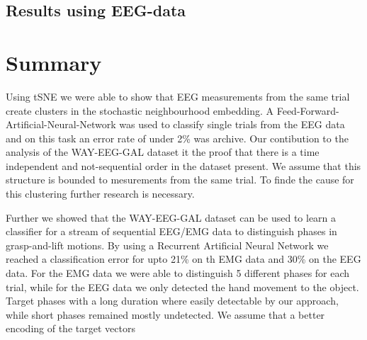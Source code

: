 \documentclass{article} %
\begin{document}
\subsection{Results using EEG-data}

\section{Summary}
Using tSNE we were able to show that EEG measurements from the same trial create clusters in the stochastic neighbourhood embedding.
A Feed-Forward-Artificial-Neural-Network was used to classify single trials from the EEG data and on this task an error rate of under 2\% was archive.
Our contibution to the analysis of the WAY-EEG-GAL dataset it the proof that there is a time independent and not-sequential order in the dataset present.
We assume that this structure is bounded to mesurements from the same trial.
To finde the cause for this clustering further research is necessary.

Further we showed that the WAY-EEG-GAL dataset can be used to learn a classifier for a stream of sequential EEG/EMG data to distinguish phases in grasp-and-lift motions.
By using a Recurrent Artificial Neural Network we reached a classification error for upto 21\% on th EMG data and 30\% on the EEG data.
For the EMG data we were able to distinguish 5 different phases for each trial, while for the EEG data we only detected the hand movement to the object.
Target phases with a long duration where easily detectable by our approach, while short phases remained mostly undetected.
We assume that a better encoding of the target vectors

\end{document}
